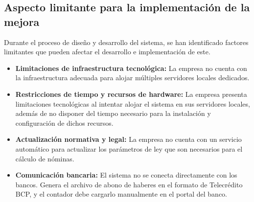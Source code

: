\subsection{Aspecto limitante para la implementación de la mejora}

Durante el proceso de diseño y desarrollo del sistema, se han identificado factores limitantes que pueden afectar el desarrollo e implementación de este.

\begin{itemize}
    \item \textbf{Limitaciones de infraestructura tecnológica:} La empresa no cuenta con la infraestructura adecuada para alojar múltiples servidores locales dedicados.
    \item \textbf{Restricciones de tiempo y recursos de hardware:} La empresa presenta limitaciones tecnológicas al intentar alojar el sistema en sus servidores locales,
     además de no disponer del tiempo necesario para la instalación y configuración de dichos recursos.
    \item \textbf{Actualización normativa y legal:} La empresa no cuenta con un servicio automático para actualizar los parámetros de ley que son necesarios para el cálculo de nóminas.
    \item \textbf{Comunicación bancaria:} El sistema no se conecta directamente con los bancos. Genera el archivo de abono de haberes en el formato de Telecrédito BCP, y el contador debe cargarlo manualmente en el portal del banco.
\end{itemize}